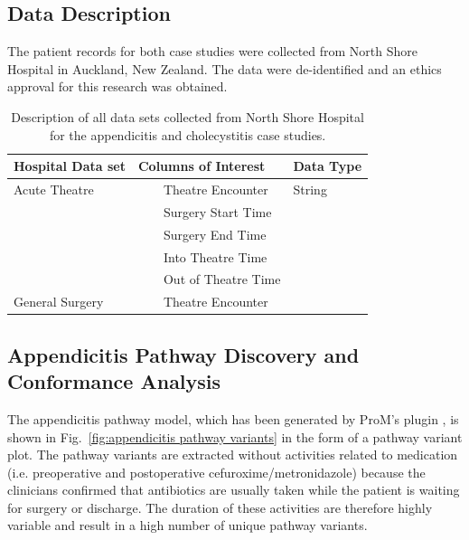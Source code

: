 \subsection{Data Description}
\label{Sec:DataDescription}
The patient records for both case studies were collected from North Shore Hospital in Auckland, New Zealand.
The data were de-identified and an ethics approval for this research was obtained.

\newcommand{\tabitem}{~~\llap{\textbullet}~~}

\begin{table}[t]
\centering
\caption{Description of all data sets collected from North Shore Hospital for the appendicitis and cholecystitis case studies.}
\label{table:data description table}
\begin{tabular}{lll}
  \hline
  \hline
Hospital Data set  &     Columns of Interest & Data Type  \\
\hline
Acute Theatre   &    \tabitem Theatre Encounter & String\\  &\tabitem Surgery Start Time\\  &\tabitem Surgery End Time\\  &\tabitem Into Theatre Time\\  &\tabitem Out of Theatre Time\\
  \hline
General Surgery   &    \tabitem Theatre Encounter\\
  \hline
  \hline
\end{tabular}
\end{table}

\subsection{Appendicitis Pathway Discovery and Conformance Analysis}
\label{Sec:AppendicitisDiscoveryConformance}
The appendicitis pathway model, which has been generated by ProM's
plugin , is shown in
Fig.~\ref{fig:appendicitis pathway variants} in the form of a pathway
variant plot.
The pathway variants are extracted without activities related to medication (i.e. preoperative and postoperative cefuroxime/metronidazole) because the clinicians confirmed that antibiotics are usually taken while the patient is waiting for surgery or discharge. The duration of these activities are therefore highly variable and result in a high number of unique pathway variants.

